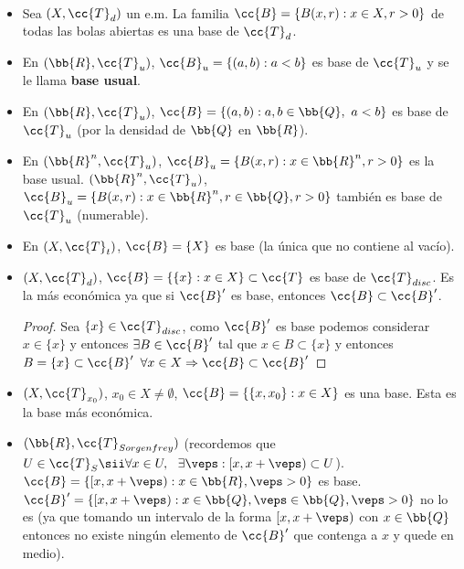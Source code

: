 \begin{ejemplo}\
    \begin{itemize}
        \item Sea $(X,\cc{T}_d)$ un e.m. La familia $\cc{B} =\{B(x,r):x\in X, r>0\}$ de todas las bolas abiertas es una base de $\cc{T}_d$.
        \item En $(\bb{R},\cc{T}_u)$, $\cc{B}_u=\{(a,b):a<b\}$ es base de $\cc{T}_u$ y se le llama \textbf{base usual}.
        \item En $(\bb{R},\cc{T}_u)$, $\cc{B}=\{(a,b): a,b\in \bb{Q},\ a<b\}$ es base de $\cc{T}_u$ (por la densidad de $\bb{Q}$ en $\bb{R}$).
        \item En $(\bb{R}^n, \cc{T}_u)$, $\cc{B}_u=\{B(x,r): x\in \bb{R}^n, r>0\}$ es la base usual. $(\bb{R}^n, \cc{T}_u)$, $\cc{B}_u=\{B(x,r): x\in \bb{R}^n, r\in \bb{Q}, r>0\}$ también es base de $\cc{T}_u$ (numerable).
        \item En $(X,\cc{T}_t)$, $\cc{B}=\{X\}$ es base (la única que no contiene al vacío).
        \item $(X,\cc{T}_d)$, $\cc{B}=\{\{x\}: x\in X\}\subset \cc{T}$ es base de $\cc{T}_{disc}$. Es la más económica ya que si $\cc{B}'$ es base, entonces $\cc{B}\subset \cc{B}'$.
        \begin{proof}
            Sea $\{x\}\in \cc{T}_{disc}$, como $\cc{B}'$ es base podemos considerar $x\in \{x\}$ y entonces $\exists B \in \cc{B}'$ tal que $x\in B \subset \{x\}$ y entonces $B=\{x\}\subset \cc{B}'$ $\forall x \in X\Rightarrow \cc{B}\subset \cc{B}'$
        \end{proof}
        \item $(X, \cc{T}_{x_0})$, $x_0 \in X \neq \emptyset$, $\cc{B}=\{\{x,x_0\}: x\in X\}$ es una base. Esta es la base más económica.
        \item $(\bb{R}, \cc{T}_{Sorgenfrey})$ (recordemos que $U \in \cc{T}_S \sii \forall x \in U,\ \ \exists \veps : [x, x+\veps)\subset U$). $\cc{B}=\{[x,x+\veps): x\in \bb{R}, \veps>0\}$ es base. $\cc{B}'=\{[x,x+\veps): x\in \bb{Q}, \veps\in \bb{Q}, \veps>0\}$ no lo es (ya que tomando un intervalo de la forma $[x,x+\veps)$ con $x\in \bb{Q}$ entonces no existe ningún elemento de $\cc{B}'$ que contenga a $x$ y quede en medio).
    \end{itemize}
    \endsquare
\end{ejemplo}

